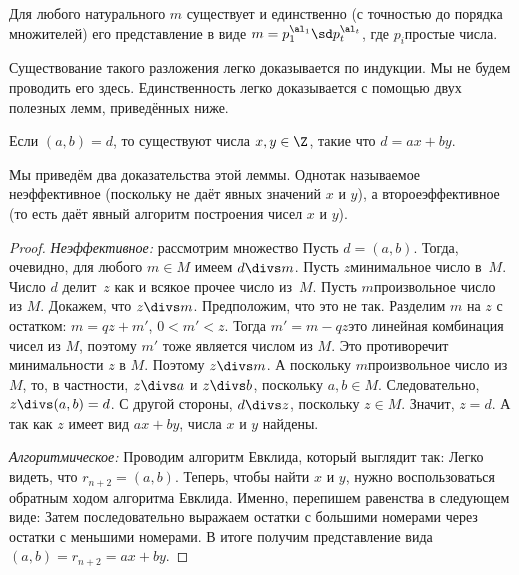 \documentclass[a4paper]{article}
\begin{document}
\begin{theorem}
    Для любого натурального $m$ существует и единственно (с точностью до порядка множителей) его представление в виде
    $m=p_1^{\al_1}\sd p_t^{\al_t}$, где $p_i$\т простые числа.
\end{theorem}

Существование такого разложения легко доказывается по индукции. Мы не будем проводить его здесь.
Единственность легко доказывается с помощью двух полезных лемм, приведённых ниже.

\begin{lemma}
Если $(a,b)=d$, то существуют числа $x,y\in\Z$, такие что $d=ax+by$.
\end{lemma}

Мы приведём два доказательства этой леммы. Одно\т так называемое неэффективное (поскольку не даёт явных
значений $x$ и $y$), а второе\т эффективное (то есть даёт явный алгоритм построения чисел $x$ и $y$).

\begin{proof}
 \emph{Неэффективное:} рассмотрим множество
Пусть $d = (a,b)$. Тогда, очевидно, для любого $m\in M$ имеем $d\divs m$.
Пусть $z$\т минимальное число в~$M$. Число $d$ делит~$z$ как и всякое прочее число из~$M$.
Пусть $m$\т произвольное число из $M$. Докажем, что $z \divs m$. Предположим, что это не так. Разделим $m$ на $z$
с остатком: $m=qz+m'$, $0<m'<z$. Тогда $m' = m -qz$\т это линейная комбинация чисел из $M$, поэтому $m'$ тоже является числом из $M$.
Это противоречит минимальности $z$ в $M$. Поэтому $z\divs m$. А поскольку $m$\т произвольное число из $M$, то, в частности,
$z\divs a$ и $z \divs b$, поскольку $a,b\in M$. Следовательно, $z \divs (a,b) = d$. С другой стороны, $d \divs z$, поскольку $z \in M$.
Значит, $z = d$. А так как $z$ имеет вид $ax+by$, числа $x$ и $y$ найдены.

 \emph{Алгоритмическое:} Проводим алгоритм Евклида, который выглядит так:
Легко видеть, что $r_{n+2}=(a,b)$. Теперь, чтобы найти $x$ и $y$, нужно воспользоваться обратным ходом алгоритма Евклида.
Именно, перепишем равенства в следующем виде:
Затем последовательно выражаем остатки с большими номерами через остатки с меньшими номерами.
В итоге получим представление вида $(a,b) = r_{n+2} = ax + by$.
\end{proof}
\end{document}
